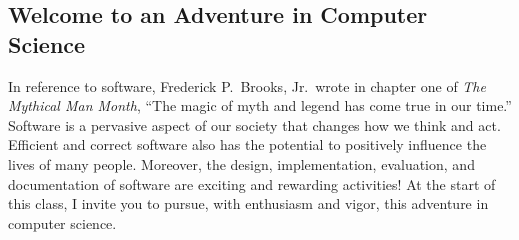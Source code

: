 \subsection*{Welcome to an Adventure in Computer Science}

In reference to software, Frederick P.\ Brooks, Jr.\ wrote in chapter one of {\em The Mythical Man Month}, ``The magic
of myth and legend has come true in our time.'' Software is a pervasive aspect of our society that changes how we think
and act.  Efficient and correct software also has the potential to positively influence the lives of many people.
Moreover, the design, implementation, evaluation, and documentation of software are exciting and rewarding activities!
At the start of this class, I invite you to pursue, with enthusiasm and vigor, this adventure in computer science.


